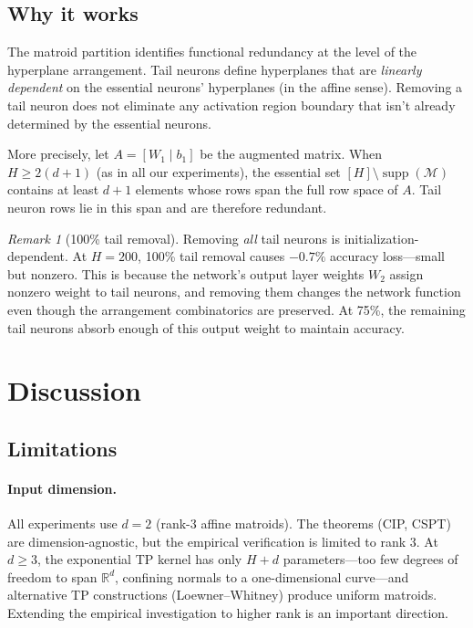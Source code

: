 \documentclass[11pt]{article}
\theoremstyle{definition}
\theoremstyle{remark}
\newtheorem{remark}[theorem]{Remark}
\newcommand{\cM}{\mathcal{M}}
\DeclareMathOperator{\supp}{supp}
\begin{document}
\subsection{Why it works}\label{sec:why-pruning}

The matroid partition identifies functional redundancy at the level
of the hyperplane arrangement.  Tail neurons define hyperplanes that
are \emph{linearly dependent} on the essential neurons' hyperplanes
(in the affine sense).  Removing a tail neuron does not eliminate any
activation region boundary that isn't already determined by the
essential neurons.

More precisely, let $A = [W_1 \mid b_1]$ be the augmented matrix.
When $H \geq 2(d+1)$ (as in all our experiments), the essential set
$[H] \setminus \supp(\cM)$ contains at least $d + 1$ elements whose
rows span the full row space of $A$.  Tail neuron rows lie in this
span and are therefore redundant.

\begin{remark}[100\% tail removal]
  Removing \emph{all} tail neurons is initialization-dependent.  At
  $H = 200$, 100\% tail removal causes $-0.7\%$ accuracy loss---small
  but nonzero.  This is because the network's output layer weights
  $W_2$ assign nonzero weight to tail neurons, and removing them
  changes the network function even though the arrangement
  combinatorics are preserved.  At 75\%, the remaining tail neurons
  absorb enough of this output weight to maintain accuracy.
\end{remark}


\section{Discussion}\label{sec:discussion}

\subsection{Limitations}\label{sec:limitations}

\paragraph{Input dimension.}
All experiments use $d = 2$ (rank-3 affine matroids).  The theorems
(CIP, CSPT) are dimension-agnostic, but the empirical verification
is limited to rank 3.  At $d \geq 3$, the exponential TP kernel
has only $H + d$ parameters---too few degrees of freedom to span
$\mathbb{R}^d$, confining normals to a one-dimensional curve---and
alternative TP constructions (Loewner--Whitney) produce uniform
matroids.  Extending the empirical investigation to
higher rank is an important direction.
\end{document}
